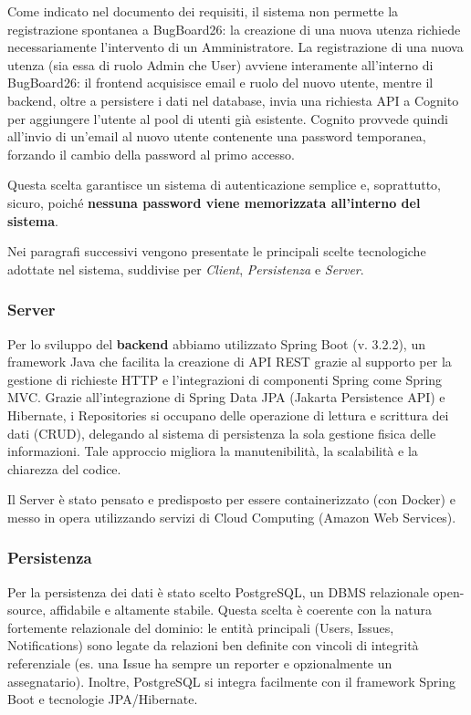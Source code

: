 \documentclass[a4paper,12pt]{article}
\begin{document}
Come indicato nel documento dei requisiti, il sistema non permette la registrazione spontanea a BugBoard26: la creazione di una nuova utenza richiede necessariamente l'intervento di un Amministratore. La registrazione di una nuova utenza (sia essa di ruolo Admin che User) avviene interamente all'interno di BugBoard26: il frontend acquisisce email e ruolo del nuovo utente, mentre il backend, oltre a persistere i dati nel database, invia una richiesta API a Cognito per aggiungere l'utente al pool di utenti già esistente. Cognito provvede quindi all'invio di un'email al nuovo utente contenente una password temporanea, forzando il cambio della password al primo accesso.

Questa scelta garantisce un sistema di autenticazione semplice e, soprattutto, sicuro, poiché \textbf{nessuna password viene memorizzata all'interno del sistema}.


Nei paragrafi successivi vengono presentate le principali scelte tecnologiche adottate nel sistema, suddivise per \textit{Client}, \textit{Persistenza} e \textit{Server}.



\subsubsection{Server} 
Per lo sviluppo del \textbf{backend} abbiamo utilizzato Spring Boot (v. 3.2.2), un framework Java che facilita la creazione di API REST grazie al supporto per la gestione di richieste HTTP e l'integrazioni di componenti Spring come Spring MVC. Grazie all'integrazione di Spring Data JPA (Jakarta Persistence API) e Hibernate, i Repositories si occupano delle operazione di lettura e scrittura dei dati (CRUD), delegando al sistema di persistenza la sola gestione fisica delle informazioni.
Tale approccio migliora la manutenibilità, la scalabilità e la chiarezza del codice.  

Il Server è stato pensato e predisposto per essere containerizzato (con Docker) e messo in opera utilizzando servizi di Cloud Computing (Amazon Web Services). 


\subsubsection{Persistenza} Per la persistenza dei dati è stato scelto PostgreSQL, un DBMS relazionale open-source, affidabile e altamente stabile. Questa scelta è coerente con la natura fortemente relazionale del dominio: le entità principali (Users, Issues, Notifications) sono legate da relazioni ben definite con vincoli di integrità referenziale (es. una Issue ha sempre un reporter e opzionalmente un assegnatario). Inoltre, PostgreSQL si integra facilmente con il
framework Spring Boot e tecnologie JPA/Hibernate.  
\end{document}
